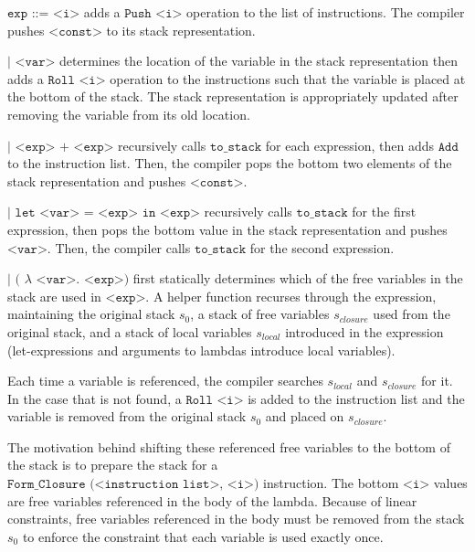 \documentclass[11pt]{article}
\begin{document}
\vspace{5mm}

$\texttt{exp ::= <i>}$ adds a $\texttt{Push <i>}$ operation to the list of instructions. The compiler pushes $\texttt{<const>}$ to its stack representation.

\medskip

\hspace{10mm}$\texttt{| <var>}$ determines the location of the variable in the stack representation then adds a $\texttt{Roll <i>}$ operation to the instructions such that the variable is placed at the bottom of the stack. The stack representation is appropriately updated after removing the variable from its old location.

\medskip

\hspace{10mm}$\texttt{| <exp> + <exp>}$ recursively calls $\texttt{to\_stack}$ for each expression, then adds $\texttt{Add}$ to the instruction list. Then, the compiler pops the bottom two elements of the stack representation and pushes $\texttt{<const>}$.

\medskip

\hspace{10mm}$\texttt{| let <var> = <exp> in <exp>}$ recursively calls $\texttt{to\_stack}$ for the first expression, then pops the bottom value in the stack representation and pushes $\texttt{<var>}$. Then, the compiler calls $\texttt{to\_stack}$ for the second expression.

\medskip

\hspace{10mm}$\texttt {| (}$ $\lambda$ $\texttt{<var>. <exp>)}$ first statically determines which of the free variables in the stack are used in $\texttt{<exp>}$. A helper function recurses through the expression, maintaining the original stack $s_0$, a stack of free variables $s_{closure}$ used from the original stack, and a stack of local variables $s_{local}$ introduced in the expression (let-expressions and arguments to lambdas introduce local variables). 

Each time a variable is referenced, the compiler searches $s_{local}$ and $s_{closure}$ for it. In the case that is not found, a $\texttt{Roll <i>}$ is added to the instruction list and the variable is removed from the original stack $s_0$ and placed on $s_{closure}$.

The motivation behind shifting these referenced free variables to the bottom of the stack is to prepare the stack for a $\texttt{Form\_Closure (<instruction list>,  <i>)}$ instruction. The bottom $\texttt{<i>}$ values are free variables referenced in the body of the lambda. Because of linear constraints, free variables referenced in the body must be removed from the stack $s_0$ to enforce the constraint that each variable is used exactly once.
\end{document}
